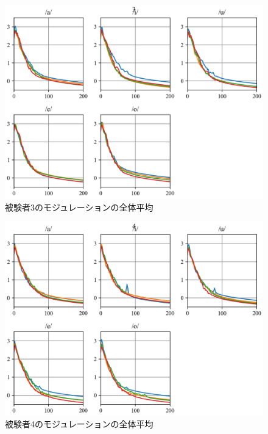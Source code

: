 \documentclass[10.5ptj,a4j,dvipdfmx,uplatex, oneside, openany]{jsbook}%
\begin{document}
\begin{figure}[htbp]
    \begin{center}
      \includegraphics[clip,width=12.0cm]{long_spectrogram_3.png}
      \caption{被験者3のモジュレーションの全体平均}
      \label{long_spectrogram_3}
    \end{center}
\end{figure}

\begin{figure}[htbp]
    \begin{center}
      \includegraphics[clip,width=12.0cm]{long_spectrogram_4.png}
      \caption{被験者4のモジュレーションの全体平均}
      \label{long_spectrogram_4}
    \end{center}
\end{figure}



\end{document}
